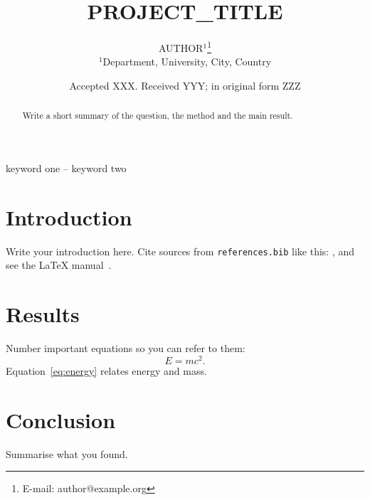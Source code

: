 \documentclass[fleqn,usenatbib]{mnras}
\title[Short title]{{{PROJECT_TITLE}}}
\author[{{AUTHOR}}]{{{AUTHOR}}$^{1}$\thanks{E-mail: author@example.org}
\\
$^{1}$Department, University, City, Country}
\date{Accepted XXX. Received YYY; in original form ZZZ}
\begin{document}
\label{firstpage}
\pagerange{\pageref{firstpage}--\pageref{lastpage}}
\maketitle

\begin{abstract}
Write a short summary of the question, the method and the main result.
\end{abstract}

\begin{keywords}
keyword one -- keyword two
\end{keywords}

\section{Introduction}
Write your introduction here. Cite sources from \texttt{references.bib} like
this: \citet{einstein1905}, and see the \LaTeX{} manual~\cite{lamport1994}.

\section{Results}
Number important equations so you can refer to them:
\begin{equation}
  E = mc^2 . \label{eq:energy}
\end{equation}
Equation~\eqref{eq:energy} relates energy and mass.

\section{Conclusion}
Summarise what you found.




\bsp
\label{lastpage}
\end{document}

